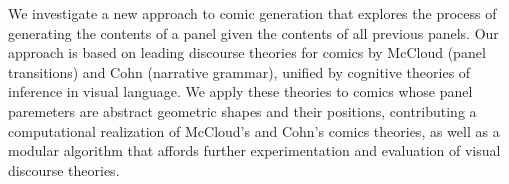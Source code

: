 We investigate a new approach to comic generation that explores the process
of generating the contents of a panel given the contents of all previous
panels.  Our approach is based on leading discourse theories for comics by
McCloud (panel transitions) and Cohn (narrative grammar), unified by
cognitive theories of inference in visual language.  We apply these
theories to comics whose panel paremeters are abstract geometric shapes and
their positions, contributing a computational realization of McCloud's and
Cohn's comics theories, as well as a modular algorithm that affords further
experimentation and evaluation of visual discourse theories.



